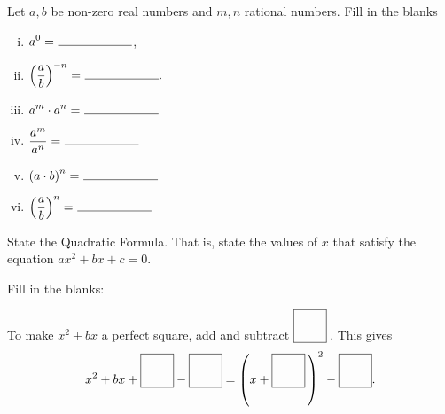 \documentclass[12pt]{amsart}
\begin{document}
\begin{thm}[6 Points]\label{ex2}
  Let $a, b$ be non-zero real numbers and $m, n$ rational numbers.
  Fill in the blanks
  \begin{multicols}{2}
    \begin{enumerate}[(i)]
    \item
      $\displaystyle{a^0 =\ \line(1,0){60}}$,
      \vspace{.15in}
    \item
      $\displaystyle{\left(\frac{a}{b}\right)^{-n} =\ \line(1,0){60}}.$
      \vspace{.15in}
    \item
      $\displaystyle{a^m \cdot a^n =\ \line(1,0){60}}$
      \vspace{.15in}
    \item
      $\displaystyle{\frac{a^m}{a^n} =\ \line(1,0){60}}$
      \vspace{.15in}
    \item
      $\displaystyle{\left(a \cdot b\right)^n =\ \line(1,0){60}}$
      \vspace{.15in}
    \item
      $\displaystyle{\left(\frac{a}{b}\right)^n =\ \line(1,0){60}}$
    \end{enumerate}
  \end{multicols}
\end{thm}

\begin{thm}[1 Points]\label{ex3}
  State the Quadratic Formula.
  That is, state the values of $x$ that satisfy the equation $ax^2 + bx + c = 0$.
  \vspace{1in}
\end{thm}

\begin{thm}[1 Points]\label{ex4}
  Fill in the blanks:\\
  \begin{center}
    To make $x^2 + bx$ a perfect square, add and subtract $\fbox{\raisebox{20px}{\hspace{20px}}}$\,.
    This gives
    $$x^2 + bx + \fbox{\raisebox{20px}{\hspace{20px}}} - \fbox{\raisebox{20px}{\hspace{20px}}} = \left(x + \fbox{\raisebox{20px}{\hspace{20px}}}\,\right)^2 - \fbox{\raisebox{20px}{\hspace{20px}}}.$$
  \end{center}
\end{thm}
\end{document}
